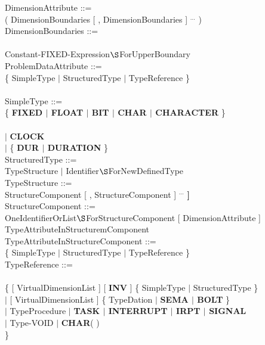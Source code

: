 DimensionAttribute ::=\\
\x ( DimensionBoundaries [ , DimensionBoundaries ] $^{...}$ )\\

DimensionBoundaries ::=\\
\\
\x Constant-FIXED-Expression$\S $ForUpperBoundary\\
        
ProblemDataAttribute ::=\\
\x [ {\bf INV} ] \{ SimpleType $\mid$ StructuredType $\mid$ TypeReference \}\\
\x [ GlobalAttribute ] [ InitialisationAttribute ]\\

SimpleType ::=\\
\x \{ {\bf FIXED $\mid$ FLOAT $\mid$ BIT $\mid$ CHAR $\mid$ CHARACTER} \}\\
\x {}\\
\x $\mid$ {\bf CLOCK}\\
\x $\mid$ \{ {\bf DUR $\mid$ DURATION} \}\\

StructuredType ::=\\
\x TypeStructure $\mid$ Identifier$\S $ForNewDefinedType\\

TypeStructure ::=\\
\x {\bf STRUCT [} StructureComponent [ , StructureComponent ] $^{...}$ {\bf ]} \\

StructureComponent ::=\\
\x OneIdentifierOrList$\S $ForStructureComponent [ DimensionAttribute ]\\
\x TypeAttributeInStructuremComponent\\

TypeAttributeInStructureComponent ::=\\
\x [ {\bf INV} ] \{ SimpleType $\mid$ StructuredType $\mid$ TypeReference \}\\

TypeReference ::=\\
 \\
\x \{ [ VirtualDimensionList ] [ {\bf INV} ] \{ SimpleType $\mid$ StructuredType \}\\
\x \x $\mid$ [ VirtualDimensionList ] \{ TypeDation $\mid$ {\bf SEMA $\mid$ BOLT} \}\\
\x \x $\mid$ TypeProcedure $\mid$ {\bf TASK $\mid$ INTERRUPT $\mid$ IRPT $\mid$ SIGNAL}\\
\x \x $\mid$ Type-VOID $\mid$ {\bf CHAR}( )\\
\x \}\\

